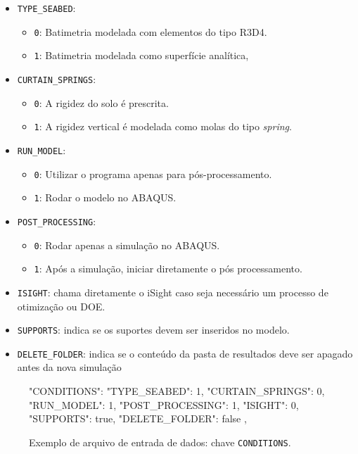 \begin{itemize}
  \item \texttt{TYPE\_SEABED}:
  \begin{itemize}
    \item \texttt{0}: Batimetria modelada com elementos do tipo R3D4.
    \item \texttt{1}: Batimetria modelada como superfície analítica,
  \end{itemize}
  \item  \texttt{CURTAIN\_SPRINGS}:
    \begin{itemize}
      \item \texttt{0}: A rigidez do solo é prescrita.
      \item \texttt{1}: A rigidez vertical é modelada como molas do tipo \textit{spring}.
    \end{itemize}
  \item \texttt{RUN\_MODEL}:
    \begin{itemize}
      \item \texttt{0}: Utilizar o programa apenas para pós-processamento.
      \item \texttt{1}: Rodar o modelo no ABAQUS.
    \end{itemize}
  \item \texttt{POST\_PROCESSING}:
    \begin{itemize}
      \item \texttt{0}: Rodar apenas a simulação no ABAQUS.
      \item \texttt{1}: Após a simulação, iniciar diretamente o pós processamento.
    \end{itemize}
  \item \texttt{ISIGHT}: chama diretamente o iSight caso seja necessário um processo de otimização ou DOE\@.
  \item \texttt{SUPPORTS}: indica se os suportes devem ser inseridos no modelo.
  \item \texttt{DELETE\_FOLDER}: indica se o conteúdo da pasta de resultados deve ser apagado antes da nova simulação
\end{itemize}

\begin{figure}
\caption{Exemplo de arquivo de entrada de dados: chave \texttt{CONDITIONS}.\label{lst:conditions}}
\begin{jsoncode}
{
  "CONDITIONS": {
    "TYPE_SEABED": 1,
    "CURTAIN_SPRINGS": 0,
    "RUN_MODEL": 1,
    "POST_PROCESSING": 1,
    "ISIGHT": 0,
    "SUPPORTS": true,
    "DELETE_FOLDER": false
  },
}
\end{jsoncode}
\end{figure}

